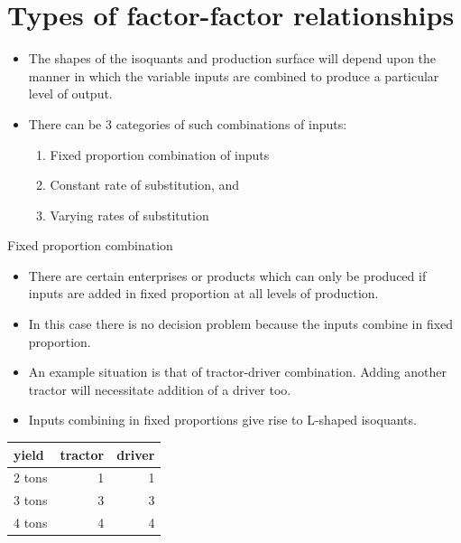\documentclass[12pt,ignorenonframetext,aspectratio=169]{beamer}
\providecommand{\tightlist}{%
  \setlength{\itemsep}{0pt}\setlength{\parskip}{0pt}}
\begin{document}
\hypertarget{types-of-factor-factor-relationships}{%
\section{Types of factor-factor
relationships}\label{types-of-factor-factor-relationships}}

\begin{frame}{}
\protect\hypertarget{section-4}{}
\begin{itemize}
\tightlist
\item
  The shapes of the isoquants and production surface will depend upon
  the manner in which the variable inputs are combined to produce a
  particular level of output.
\item
  There can be 3 categories of such combinations of inputs:

  \begin{enumerate}
  \tightlist
  \item
    Fixed proportion combination of inputs
  \item
    Constant rate of substitution, and
  \item
    Varying rates of substitution
  \end{enumerate}
\end{itemize}
\end{frame}

\begin{frame}{Fixed proportion combination}
\protect\hypertarget{fixed-proportion-combination}{}
\begin{itemize}
\tightlist
\item
  There are certain enterprises or products which can only be produced
  if inputs are added in fixed proportion at all levels of production.
\item
  In this case there is no decision problem because the inputs combine
  in fixed proportion.
\item
  An example situation is that of tractor-driver combination. Adding
  another tractor will necessitate addition of a driver too.
\item
  Inputs combining in fixed proportions give rise to L-shaped isoquants.
\end{itemize}

\begin{table}[H]
\centering
\begin{tabular}{lrr}
\toprule
yield & tractor & driver\\
\midrule
\rowcolor{gray!6}  2 tons & 1 & 1\\
3 tons & 3 & 3\\
\rowcolor{gray!6}  4 tons & 4 & 4\\
\bottomrule
\end{tabular}
\end{table}
\end{frame}
\end{document}
